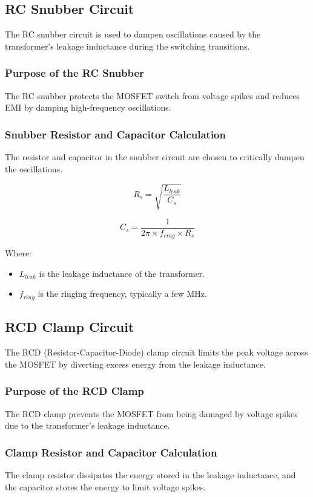 \documentclass{article}
\begin{document}
\subsection{RC Snubber Circuit}
The RC snubber circuit is used to dampen oscillations caused by the transformer's leakage inductance during the switching transitions.

\subsubsection{Purpose of the RC Snubber}
The RC snubber protects the MOSFET switch from voltage spikes and reduces EMI by damping high-frequency oscillations.

\subsubsection{Snubber Resistor and Capacitor Calculation}
The resistor and capacitor in the snubber circuit are chosen to critically dampen the oscillations.

\[
R_s = \sqrt{\frac{L_{leak}}{C_s}}
\]

\[
C_s = \frac{1}{2 \pi \times f_{ring} \times R_s}
\]

Where:
\begin{itemize}
    \item $L_{leak}$ is the leakage inductance of the transformer.
    \item $f_{ring}$ is the ringing frequency, typically a few MHz.
\end{itemize}

\subsection{RCD Clamp Circuit}
The RCD (Resistor-Capacitor-Diode) clamp circuit limits the peak voltage across the MOSFET by diverting excess energy from the leakage inductance.

\subsubsection{Purpose of the RCD Clamp}
The RCD clamp prevents the MOSFET from being damaged by voltage spikes due to the transformer's leakage inductance.

\subsubsection{Clamp Resistor and Capacitor Calculation}
The clamp resistor dissipates the energy stored in the leakage inductance, and the capacitor stores the energy to limit voltage spikes.
\end{document}

